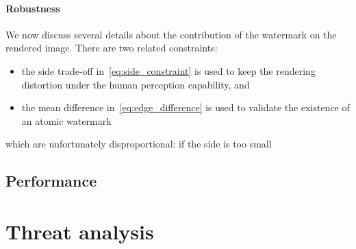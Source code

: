 \paragraph[Robustness]{Robustness}\label{par:robustness}
We now discuss several details about the contribution of the watermark on the rendered image. There are two related constraints:
\begin{itemize}
    \item the side trade-off in~\autoref{eq:side_constraint} is used to keep the rendering distortion under the human perception capability, and
    \item the mean difference in~\autoref{eq:edge_difference} is used to validate the existence of an atomic watermark
\end{itemize}
which are unfortunately disproportional: if the side is too small

\subsection[Performance]{Performance}

\section[Threat analysis]{Threat analysis}